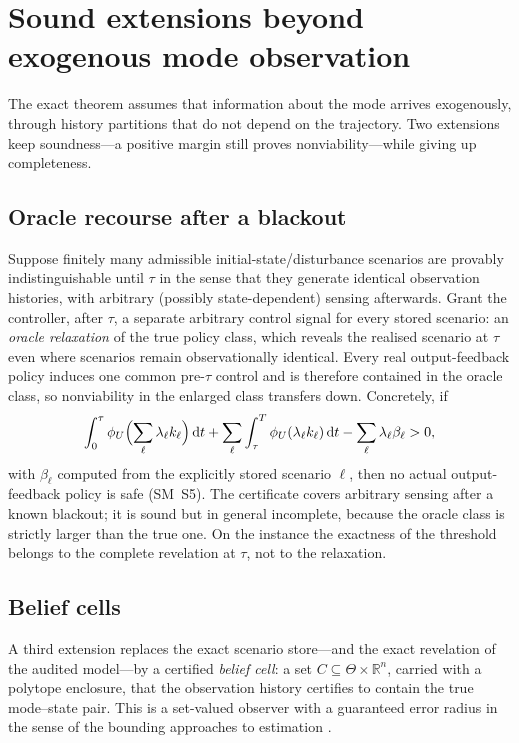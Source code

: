 \documentclass[11pt,a4paper]{article}
\theoremstyle{plain}
\theoremstyle{definition}
\theoremstyle{remark}
\newcommand{\R}{\mathbb{R}}
\newcommand{\dd}{\,\mathrm{d}}
\begin{document}
\section{Sound extensions beyond exogenous mode observation}\label{sec:extensions}

The exact theorem assumes that information about the mode arrives exogenously, through history partitions that do not depend on the trajectory. Two extensions keep soundness---a positive margin still proves nonviability---while giving up completeness.

\subsection{Oracle recourse after a blackout}

Suppose finitely many admissible initial-state/disturbance scenarios are provably indistinguishable until $\tau$ in the sense that they generate identical observation histories, with arbitrary (possibly state-dependent) sensing afterwards. Grant the controller, after $\tau$, a separate arbitrary control signal for every stored scenario: an \emph{oracle relaxation} of the true policy class, which reveals the realised scenario at $\tau$ even where scenarios remain observationally identical. Every real output-feedback policy induces one common pre-$\tau$ control and is therefore contained in the oracle class, so nonviability in the enlarged class transfers down. Concretely, if
\begin{equation}\label{eq:oracle}
\int_0^\tau\phi_U\Bigl(\sum_\ell\lambda_\ell k_\ell\Bigr)\dd t+\sum_\ell\int_\tau^T\phi_U(\lambda_\ell k_\ell)\dd t-\sum_\ell\lambda_\ell\beta_\ell>0 ,
\end{equation}
with $\beta_\ell$ computed from the explicitly stored scenario $\ell$, then no actual output-feedback policy is safe (SM~S5). The certificate covers arbitrary sensing after a known blackout; it is sound but in general incomplete, because the oracle class is strictly larger than the true one. On the instance the exactness of the threshold belongs to the complete revelation at $\tau$, not to the relaxation.

\subsection{Belief cells}

A third extension replaces the exact scenario store---and the exact revelation of the audited model---by a certified \emph{belief cell}: a set $C\subseteq\Theta\times\R^n$, carried with a polytope enclosure, that the observation history certifies to contain the true mode--state pair. This is a set-valued observer with a guaranteed error radius in the sense of the bounding approaches to estimation \cite{Witsenhausen1968,Milanese1996}.
\end{document}
